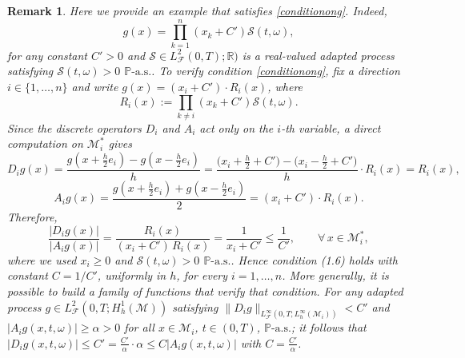 \documentclass[11pt,oneside,leqno]{amsart}
\numberwithin{equation}{section}
\numberwithin{equation}{section}
\newtheorem{remark}[theorem]{Remark}
\begin{document}
{ \begin{remark}
    Here we provide an example that satisfies \eqref{conditionong}. Indeed, \begin{equation*}
    g(x) = \prod_{k=1}^n (x_k + C')\mathcal{S}(t,\omega),
\end{equation*}
for any constant $C' > 0$ and $\mathcal{S}\in L^{2}_{\mathcal{F}}(0,T);\mathbb{R})$ is a real-valued adapted process satisfying $\mathcal{S}(t,\omega)>0$ $\mathbb{P}\text{-a.s.}$. To verify condition \eqref{conditionong}, fix a direction
$i \in \{1, \ldots, n\}$ and write $g(x) = (x_{i} + C') \cdot R_{i}(x)$, where
\begin{equation*}
    R_{i}(x) := \prod_{k \neq i} (x_{k} + C')\mathcal{S}(t,\omega).
\end{equation*}
Since the discrete operators $D_{i}$ and $A_{i}$ act only on the $i$-th variable, a direct
computation on $\mathcal{M}_{i}^{\ast}$ gives
\begin{equation*}
    D_{i} g(x)
    = \frac{g\!\left(x + \tfrac{h}{2}e_{i}\right) - g\!\left(x - \tfrac{h}{2}e_{i}\right)}{h}
    = \frac{\bigl(x_{i} + \tfrac{h}{2} + C'\bigr) - \bigl(x_{i} - \tfrac{h}{2} + C'\bigr)}{h}
      \cdot R_{i}(x)
    = R_{i}(x),
\end{equation*}
\begin{equation*}
    A_{i} g(x)
    = \frac{g\!\left(x + \tfrac{h}{2}e_{i}\right) + g\!\left(x - \tfrac{h}{2}e_{i}\right)}{2}
    = (x_{i} + C') \cdot R_{i}(x).
\end{equation*}
Therefore,
\begin{equation*}
    \frac{|D_{i} g(x)|}{|A_{i} g(x)|}
    = \frac{R_{i}(x)}{(x_{i} + C')\, R_{i}(x)}
    = \frac{1}{x_{i} + C'}
    \leq \frac{1}{C'},
    \qquad \forall\, x \in \mathcal{M}_{i}^{\ast},
\end{equation*}
where we used $x_{i} \geq 0$ and $\mathcal{S}(t,\omega)>0$ $\mathbb{P}\text{-a.s.}$. Hence condition (1.6) holds with constant
$C = 1/C'$, uniformly in $h$, for every $i = 1, \ldots, n$.
  More generally, it is possible to build a family of functions that verify that condition. For any adapted process $g\in L^{2}_{\mathcal{F}}(0,T;H_{h}^{1}(\mathcal{M}))$ satisfying  $\|D_{i}g\|_{L^{\infty}_{\mathcal{F}}(0,T;L^{\infty}_{h}(\mathcal{M}_{i}))}<C'$ and $|A_{i}g(x,t,\omega)|\geq\alpha>0$ for all $x\in \mathcal{M}_{i}$, $t\in (0,T)$, $\mathbb{P}\text{-a.s.}$; it follows that $|D_{i}g(x,t,\omega)|\leq C'=\frac{C'}{\alpha}\cdot\alpha\leq C|A_{i}g(x,t,\omega)|$ with $C=\tfrac{C'}{\alpha}$.
\end{remark}}
\end{document}

